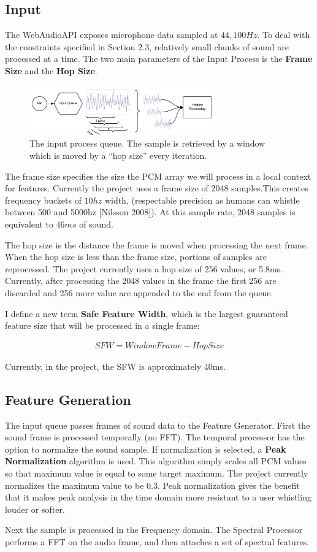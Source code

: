 \documentclass[DIV=calc, paper=a4, fontsize=11pt, twocolumn]{scrartcl}   %
\begin{document}
\subsection{Input}
The WebAudioAPI exposes microphone data sampled at $44,100Hz$. To deal with the constraints specified in Section 2.3, relatively small chunks of sound are processed at a time. The two main parameters of the Input Process is the \textbf{Frame Size} and the \textbf{Hop Size}.
\begin{figure}[h]
\centering
\includegraphics[width=80mm]{figures/InputDiagram.png}
\caption{The input process queue. The sample is retrieved by a window which is moved by a ``hop size'' every iteration.}
\label{overflow}
\end{figure}

The frame size specifies the size the PCM array we will process in a local context for features. Currently the project uses a frame size of 2048 samples.This creates frequency buckets of $10hz$ width, (respectable precision as humans can whistle between 500 and 5000hz [Nilsson 2008]). At this sample rate, 2048 samples is equivalent to $46ms$ of sound.
\par The hop size is the distance the frame is moved when processing the next frame. When the hop size is less than the frame size, portions of samples are reprocessed. The project currently uses a hop size of 256 values, or 5.8ms. Currently, after processing the 2048 values in the frame the first 256 are discarded and 256 more value are appended to the end from the queue. \par I define a new term \textbf{Safe Feature Width}, which is the largest guaranteed feature size that will be processed in a single frame:

\begin{align}
   SFW = WindowFrame - HopSize
\end{align}

Currently, in the project, the SFW is approximately 40ms.

\subsection{Feature Generation}

The input queue passes frames of sound data to the Feature Generator. First the sound frame is processed temporally (no FFT). The temporal processor has the option to normalize the sound sample. If normalization is selected, a \textbf{Peak Normalization} algorithm is used. This algorithm simply scales all PCM values so that maximum value is equal to some target maximum. The project currently normalizes the maximum value to be $0.3$. Peak normalization gives the benefit that it makes peak analysis in the time domain more resistant to a user whistling louder or softer.
\par Next the sample is processed in the Frequency domain. The Spectral Processor performs a FFT on the audio frame, and then attaches a set of spectral features.
\end{document}
